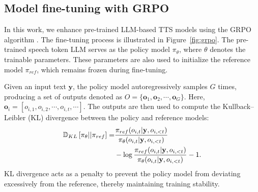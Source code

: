 \documentclass{article}
\begin{document}
\vspace{-0.4cm}
\subsection{Model fine-tuning with GRPO}
\label{ssec:grpo}
\vspace{-0.2cm}

In this work, we enhance pre-trained LLM-based TTS models using the GRPO algorithm \cite{deepseekmath}. The fine-tuning process is illustrated in Figure~\ref{fig:grpo}. The pre-trained speech token LLM serves as the policy model $\pi_\theta$, where $\theta$ denotes the trainable parameters. These parameters are also used to initialize the reference model $\pi_{ref}$, which remains frozen during fine-tuning.

Given an input text $\mathbf{y}$, the policy model autoregressively samples $G$ times, producing a set of outputs denoted as $O=\{\mathbf{o}_1, \mathbf{o}_2, \cdots, \mathbf{o}_G \}$. Here, $\mathbf{o}_i=[o_{i,1}, o_{i,2}, \cdots, o_{i,t}, \cdots ]$. The outputs are then used to compute the Kullback–Leibler (KL) divergence between the policy and reference models:
\begin{equation}
\setlength\abovedisplayskip{3pt}
\setlength\belowdisplayskip{3pt}
\begin{split}
\mathbb{D}_{KL}\left[ \pi_{\theta}||\pi_{ref} \right] = &  \frac{\pi_{ref}(o_{i,t}|\mathbf{y}, o_{i,<t})}{\pi_{\theta}(o_{i,t}|\mathbf{y}, o_{i,<t})} \\
&  - \log \frac{\pi_{ref}(o_{i,t}|\mathbf{y}, o_{i,<t})}{\pi_{\theta}(o_{i,t}|\mathbf{y}, o_{i,<t})} - 1.
\end{split}
\end{equation}
KL divergence acts as a penalty to prevent the policy model from deviating excessively from the reference, thereby maintaining training stability.
\end{document}
